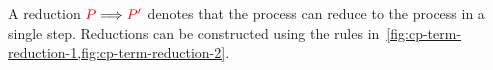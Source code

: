 \begin{definition}\label{def:cp-term-reduction-1}
  A reduction $\textcolor{red}{P}\Longrightarrow\textcolor{red}{P'}$ denotes that the process  can reduce to
  the process  in a single step. Reductions can be constructed using the
  rules in~\cref{fig:cp-term-reduction-1,fig:cp-term-reduction-2}. 
\end{definition}
